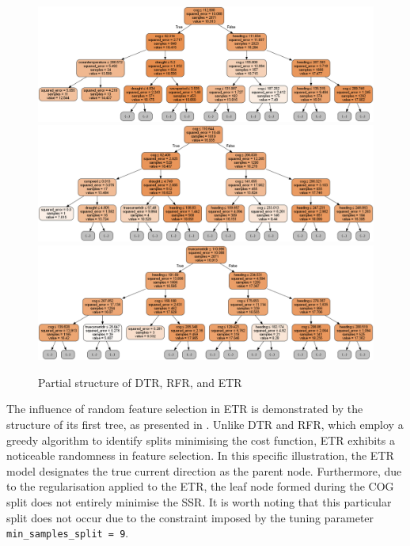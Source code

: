
\begin{figure}
    \centering
    \includegraphics[width=.9\textwidth]{02_figures/dtr_mod_1tree.png}\\
    \includegraphics[width=.9\textwidth]{02_figures/rfr_mod_it1.png}\\
    \includegraphics[width=.9\textwidth]{02_figures/etr_mod_it1.png}
    \caption{Partial structure of DTR, RFR, and ETR}
    \label{fig:overall_tree_partial_structure}
\end{figure}

The influence of random feature selection in ETR is demonstrated by the structure of its first tree, as presented in . Unlike DTR and RFR, which employ a greedy algorithm to identify splits minimising the cost function, ETR exhibits a noticeable randomness in feature selection. In this specific illustration, the ETR model designates the true current direction as the parent node. Furthermore, due to the regularisation applied to the ETR, the leaf node formed during the COG split does not entirely minimise the SSR. It is worth noting that this particular split does not occur due to the constraint imposed by the tuning parameter {\tt min\_samples\_split = 9}.\\

